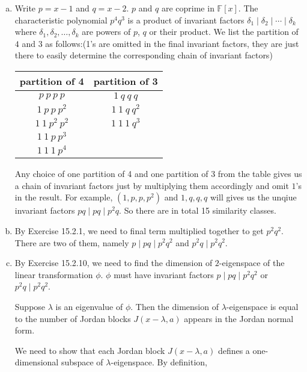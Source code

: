 \documentclass[a4paper, 12pt]{article}
\begin{document}
\begin{solution}
\begin{enumerate}[(a)]
\item Write \(p=x-1\) and \(q=x-2\). \(p\) and \(q\) are coprime in \(\mathbb{F}[x]\). The characteristic polynomial \(p^4q^3\) is a product of invariant factors \(\delta_1\mid \delta_2\mid \cdots\mid \delta_k\) where 
\(\delta_1,\delta_2,\ldots,\delta_k\) are powers of \(p\), \(q\) or their product. We list the partition of \(4\) and \(3\) as follows:(1's are omitted in the final invariant factors, they are just there to easily determine the corresponding chain of invariant factors)
\begin{center}
\begin{tabular}{||c|c||}
	\hline
	partition of 4 & partition of 3 \\ [0.5ex] 
	\hline\hline
	$p\ p\ p\ p$ & $1\ q\ q\ q$\\ 
	\hline 
	$1\ p\ p\ p^2$ & $1\ 1\ q\ q^2$\\ 
	\hline 
	$1\  1\  p^2\ p^2$ & $1\ 1\ 1\ q^3$\\ 
	\hline 
	$1\ 1\ p\ p^3$ & \\ 
	\hline 
	$1\ 1\ 1\ p^4$ & \\ [1ex]
	\hline 
\end{tabular}
\end{center}
Any choice of one partition of 4 and one partition of 3 from the table gives us a chain of invariant factors just by multiplying them accordingly and omit \(1\)'s in the result. For example, 
\((1,p,p,p^2)\) and \(1,q,q,q\) will gives us the unqiue invariant factors \(pq\mid pq\mid p^2q\). So there are in total 15 similarity classes. 
\item By Exercise 15.2.1, we need to final term multiplied together to get \(p^2q^2\). There are two of them, namely \(p\mid pq\mid p^2q^2\) and \(p^2q\mid p^2q^2\).
\item By Exercise 15.2.10, we need to find the dimension of \(2\)-eigenspace of the linear transformation \(\phi\). \(\phi\) must have invariant factors \(p\mid pq\mid p^2q^2\) or \(p^2q\mid p^2q^2\). 
\begin{claim}
Suppose \(\lambda\) is an eigenvalue of \(\phi\). Then the dimension of \(\lambda\)-eigenspace is equal to the number of Jordan blocks \(J(x-\lambda,a)\) appears in the Jordan normal form. 
\end{claim}
\begin{claimproof}
We need to show that each Jordan block \(J(x-\lambda,a)\) defines a one-dimensional subspace of \(\lambda\)-eigenspace. By definition, 

\end{claimproof}
\end{enumerate}
\end{solution}
\end{document}
